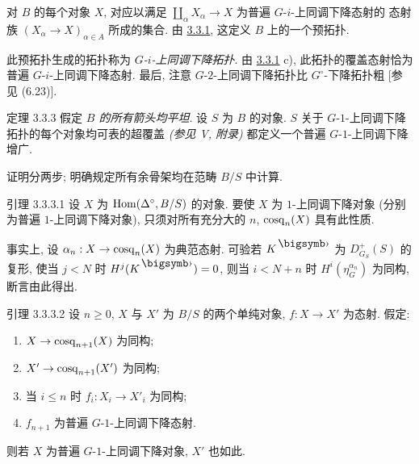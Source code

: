 \setcounter{subsubsection}{1}



\subsubsection{}
对 $B$ 的每个对象 $X$, 对应以满足
$\coprod_\alpha X_\alpha\to X$ 为普遍 $G$-$i$-上同调下降态射的
态射族 $(X_\alpha\to X)_{\alpha\in A}$ 所成的集合.
由 \hyperref[Vbis.prop3.3.1]{3.3.1}, 这定义 $B$ 上的一个预拓扑.

此预拓扑生成的拓扑称为 \emph{$G$-$i$-上同调下降拓扑}.
由 \hyperref[Vbis.prop3.3.1]{3.3.1} c), 此拓扑的覆盖态射恰为普遍
$G$-$i$-上同调下降态射.
最后, 注意 $G$-$2$-上同调下降拓扑比 $G^{\circ}$-下降拓扑粗
[参见 \cite{sga4.exp.Vbis.bib.4} (6.23)].

\begin{enonce*}{定理 3.3.3}
假定 \emph{$B$ 的所有箭头均平坦}. 设 $S$ 为 $B$ 的对象.
$S$ 关于 $G$-$1$-上同调下降拓扑的每个对象均可表的超覆盖
\emph{(参见 V, 附录)} 都定义一个普遍 $G$-$1$-上同调下降增广.
\end{enonce*}

证明分两步; 明确规定所有余骨架均在范畴 $B/S$ 中计算.

\begin{enonce*}{引理 3.3.3.1}
设\pageoriginale{} $X$ 为 $\operatorname{Hom}(\Delta^{\circ},B/S)$ 的对象.
要使 $X$ 为 $1$-上同调下降对象 (分别为普遍 $1$-上同调下降对象),
只须对所有充分大的 $n$, $\operatorname{cosq}_n(X)$ 具有此性质.
\end{enonce*}

事实上, 设 $\alpha_n:X\to\cosk_n(X)$ 为典范态射.
可验若 $K^{\bigdot}$ 为 $D^+_{G_S}(S)$ 的复形,
使当 $j<N$ 时 $H^j(K^{\bigdot})=0$,
则当 $i<N+n$ 时 $H^i(\eta_G^{\alpha_n})$ 为同构, 断言由此得出.

\begin{enonce*}{引理 3.3.3.2}
设 $n\geq0$, $X$ 与 $X'$ 为 $B/S$ 的两个单纯对象, $f:X\to X'$ 为态射.
假定:
\begin{enumerate}
\renewcommand{\theenumi}{\roman{enumi}}
\renewcommand{\labelenumi}{(\theenumi)}
\item $X\to\cosk_{n+1}(X)$ 为同构;

\item $X'\to\cosk_{n+1}(X')$ 为同构;

\item 当 $i\leq n$ 时 $f_i:X_i\to X'_i$ 为同构;

\item $f_{n+1}$ 为普遍 $G$-$1$-上同调下降态射.
\end{enumerate}
则若 $X$ 为普遍 $G$-$1$-上同调下降对象, $X'$ 也如此.
\end{enonce*}

